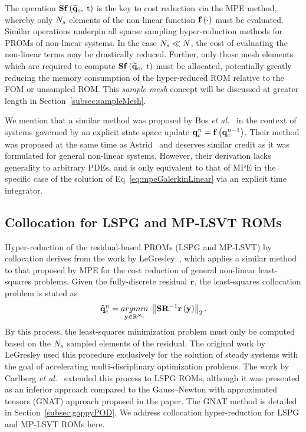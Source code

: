 The operation $\mathbf{S} \mathbf{f} \left(\mathbf{\widetilde{q}}_{c}, \; \text{t}\right)$ is the key to cost reduction via the MPE method, whereby only $N_s$ elements of the non-linear function $\mathbf{f} \left(\cdot\right)$ must be evaluated. Similar operations underpin all sparse sampling hyper-reduction methods for PROMs of non-linear systems. In the case $N_s \ll N$, the cost of evaluating the non-linear terms may be drastically reduced. Further, only those mesh elements which are required to compute $\mathbf{S} \mathbf{f} \left(\mathbf{\widetilde{q}}_{c}, \; \text{t}\right)$ must be allocated, potentially greatly reducing the memory consumption of the hyper-reduced ROM relative to the FOM or unsampled ROM. This \textit{sample mesh} concept will be discussed at greater length in Section~\ref{subsec:sampleMesh}.

We mention that a similar method was proposed by Bos \textit{et al.}~\cite{Bos2004} in the context of systems governed by an explicit state space update $\mathbf{q}_{c}^{n} = \mathbf{f} \left(\mathbf{q}_{c}^{n - 1}\right)$. Their method was proposed at the same time as Astrid~\cite{Astrid2004} and deserves similar credit as it was formulated for general non-linear systems. However, their derivation lacks generality to arbitrary PDEs, and is only equivalent to that of MPE in the specific case of the solution of Eq~\ref{eq:mpeGalerkinLinear} via an explicit time integrator.

\subsection{Collocation for LSPG and MP-LSVT ROMs}

Hyper-reduction of the residual-based PROMs (LSPG and MP-LSVT) by collocation derives from the work by LeGresley~\cite{LeGresley2005}, which applies a similar method to that proposed by MPE for the cost reduction of general non-linear least-squares problems. Given the fully-discrete residual $\mathbf{r}$, the least-squares collocation problem is stated as
%
\begin{equation}\label{eq:collocLSPG}
	\consVecCoef^{\timeIdx} = \argmin{\dummyVec \inROne{\numConsModes}} \left\Vert \sampMat \resScaleInv \resFunc{\dummyVec} \right\Vert_2.
\end{equation}
%
By this process, the least-squares minimization problem must only be computed based on the $N_s$ sampled elements of the residual. The original work by LeGresley used this procedure exclusively for the solution of steady systems with the goal of accelerating multi-disciplinary optimization problems. The work by Carlberg \textit{et al.}~\cite{Carlberg2013} extended this process to LSPG ROMs, although it was presented as an inferior approach compared to the Gauss--Newton with approximated tensors (GNAT) approach proposed in the paper. The GNAT method is detailed in Section~\ref{subsec:gappyPOD}. We address collocation hyper-reduction for LSPG and MP-LSVT ROMs here.

